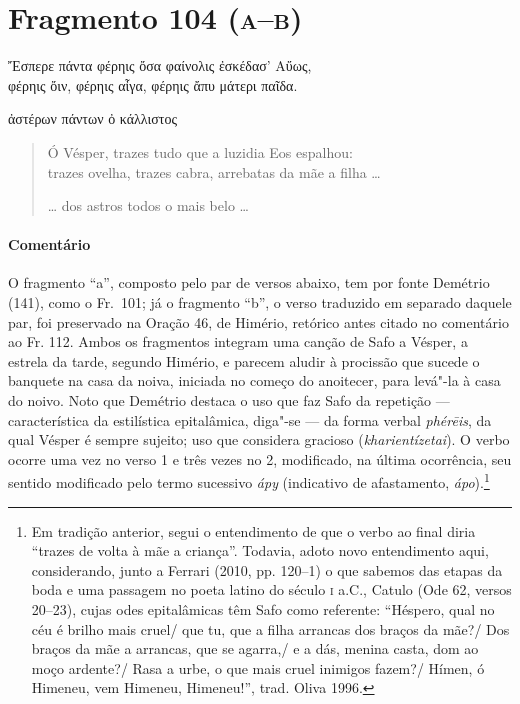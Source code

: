 {\pagebreak
\section{Fragmento 104 (\textsc{a--b})}

\begin{gkverse}
Ἔσπερε πάντα φέρηις ὄσα φαίνολις ἐσκέδασ’ Αὔως,\\
      φέρηις ὄιν, φέρηις αἶγα, φέρηις ἄπυ μάτερι παῖδα.

\ast\quad\ast\quad\ast

ἀστέρων πάντων ὀ κάλλιστος
\end{gkverse}

\begin{verse}
Ó Vésper, trazes tudo que a luzidia Eos espalhou:\\
trazes ovelha, trazes cabra, arrebatas da mãe a filha \ldots{}

\ast\quad\ast\quad\ast

\ldots{} dos astros todos o mais belo \ldots{} 
\end{verse}

{\paragraph{Comentário} O fragmento “a”, composto pelo par de versos abaixo, tem por fonte Demétrio (141),
como o Fr.~101; já o fragmento “b”, o verso traduzido em separado daquele par,
foi preservado na Oração 46, de Himério, retórico antes citado no comentário ao Fr. 112.
Ambos os fragmentos integram uma canção de Safo a Vésper, a estrela da tarde,
segundo Himério, e parecem aludir à procissão que sucede o banquete na casa da
noiva, iniciada no começo do anoitecer, para levá"-la à casa do noivo.
Noto que Demétrio destaca o uso que faz Safo da repetição --- característica da estilística epitalâmica, diga"-se --- da forma verbal \textit{phérēis}, da qual Vésper é sempre sujeito; uso que considera gracioso (\textit{kharientízetai}). O verbo ocorre uma vez no verso 1 e três vezes no 2, modificado, na última ocorrência, seu sentido modificado pelo termo sucessivo \textit{ápy} (indicativo de afastamento, \textit{ápo}).\footnote{Em tradição anterior, segui o entendimento de que o verbo ao final diria ``trazes de volta à mãe a criança''. Todavia, adoto novo entendimento aqui, considerando, junto a Ferrari (2010, pp. 120--1) o que sabemos das etapas da boda e uma passagem no poeta latino do século \textsc{i} a.C., Catulo (Ode 62, versos 20--23), cujas odes epitalâmicas têm Safo como referente: ``Héspero, qual no céu é brilho mais cruel/ que tu, que a filha arrancas dos braços da mãe?/ Dos braços da mãe a arrancas, que se agarra,/ e a dás, menina casta, dom ao moço ardente?/ Rasa a urbe, o que mais cruel inimigos fazem?/ Hímen, ó Himeneu, vem Himeneu, Himeneu!'', trad. Oliva 1996.} }




}
